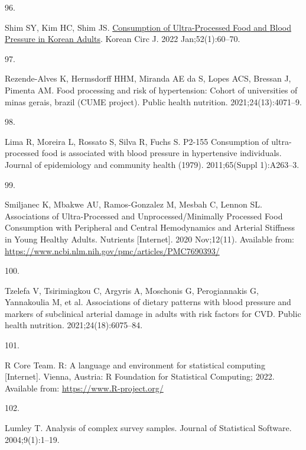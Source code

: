 \documentclass[
]{article}
\newlength{\cslhangindent}
\newlength{\csllabelwidth}
\newlength{\cslentryspacingunit} %
\newenvironment{CSLReferences}[2] %
 {%
  \setlength{\parindent}{0pt}
  \ifodd #1
  \let\oldpar\par
  \def\par{\hangindent=\cslhangindent\oldpar}
  \fi
  \setlength{\parskip}{#2\cslentryspacingunit}
 }%
 {}
\newcommand{\CSLLeftMargin}[1]{\parbox[t]{\csllabelwidth}{#1}}
\newcommand{\CSLRightInline}[1]{\parbox[t]{\linewidth - \csllabelwidth}{#1}\break}
\begin{document}
\begin{CSLReferences}{0}{0}
\leavevmode{}%
\CSLLeftMargin{96. }%
\CSLRightInline{Shim SY, Kim HC, Shim JS.
\href{https://doi.org/10.4070/kcj.2021.0228}{Consumption of
{Ultra-Processed Food} and {Blood Pressure} in {Korean Adults}}. Korean
Circ J. 2022 Jan;52(1):60--70. }

\leavevmode{}%
\CSLLeftMargin{97. }%
\CSLRightInline{Rezende-Alves K, Hermsdorff HHM, Miranda AE da S, Lopes
ACS, Bressan J, Pimenta AM. Food processing and risk of hypertension:
{Cohort} of universities of minas gerais, brazil ({CUME} project).
Public health nutrition. 2021;24(13):4071--9. }

\leavevmode{}%
\CSLLeftMargin{98. }%
\CSLRightInline{Lima R, Moreira L, Rossato S, Silva R, Fuchs S. P2-155
Consumption of ultra-processed food is associated with blood pressure in
hypertensive individuals. Journal of epidemiology and community health
(1979). 2011;65(Suppl 1):A263--3. }

\leavevmode{}%
\CSLLeftMargin{99. }%
\CSLRightInline{Smiljanec K, Mbakwe AU, Ramos-Gonzalez M, Mesbah C,
Lennon SL. Associations of Ultra-Processed and Unprocessed/Minimally
Processed Food Consumption with Peripheral and Central Hemodynamics and
Arterial Stiffness in Young Healthy Adults. Nutrients {[}Internet{]}.
2020 Nov;12(11). Available from:
\url{https://www.ncbi.nlm.nih.gov/pmc/articles/PMC7690393/}}

\leavevmode{}%
\CSLLeftMargin{100. }%
\CSLRightInline{Tzelefa V, Tsirimiagkou C, Argyris A, Moschonis G,
Perogiannakis G, Yannakoulia M, et al. Associations of dietary patterns
with blood pressure and markers of subclinical arterial damage in adults
with risk factors for {CVD}. Public health nutrition.
2021;24(18):6075--84. }

\leavevmode{}%
\CSLLeftMargin{101. }%
\CSLRightInline{R Core Team. {R}: A language and environment for
statistical computing {[}Internet{]}. Vienna, Austria: R Foundation for
Statistical Computing; 2022. Available from:
\url{https://www.R-project.org/}}

\leavevmode{}%
\CSLLeftMargin{102. }%
\CSLRightInline{Lumley T. Analysis of complex survey samples. Journal of
Statistical Software. 2004;9(1):1--19. }

\end{CSLReferences}
\end{document}
